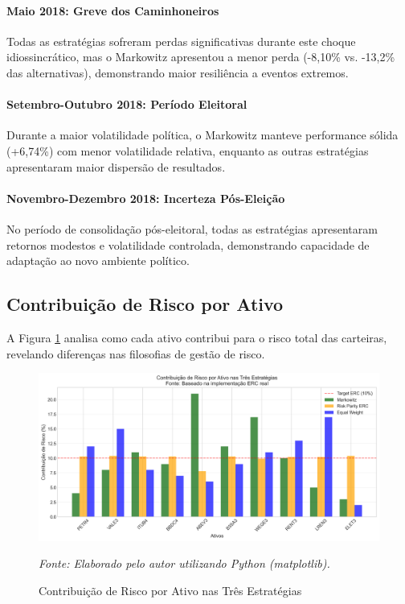 \paragraph{Maio 2018: Greve dos Caminhoneiros}
Todas as estratégias sofreram perdas significativas durante este choque idiossincrático, mas o Markowitz apresentou a menor perda (-8,10\% vs. -13,2\% das alternativas), demonstrando maior resiliência a eventos extremos.

\paragraph{Setembro-Outubro 2018: Período Eleitoral}
Durante a maior volatilidade política, o Markowitz manteve performance sólida (+6,74\%) com menor volatilidade relativa, enquanto as outras estratégias apresentaram maior dispersão de resultados.

\paragraph{Novembro-Dezembro 2018: Incerteza Pós-Eleição}
No período de consolidação pós-eleitoral, todas as estratégias apresentaram retornos modestos e volatilidade controlada, demonstrando capacidade de adaptação ao novo ambiente político.

\subsection{Contribuição de Risco por Ativo}

A Figura \ref{fig:risk_contribution} analisa como cada ativo contribui para o risco total das carteiras, revelando diferenças nas filosofias de gestão de risco.

\begin{figure}[H]
\centering
\includegraphics[width=\textwidth]{images/risk_contribution.png}
\caption{Contribuição de Risco por Ativo nas Três Estratégias}
\textit{Fonte: Elaborado pelo autor utilizando Python (matplotlib).}
\label{fig:risk_contribution}
\end{figure}

